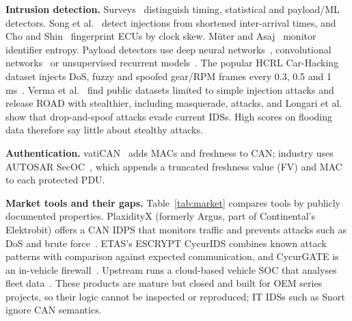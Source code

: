 \documentclass[runningheads]{llncs}
\begin{document}
\textbf{Intrusion detection.} Surveys~\cite{wu2020survey} distinguish timing, statistical and payload/ML detectors.
Song et al.~\cite{song2016} detect injections from shortened inter-arrival times, and Cho and Shin~\cite{cho2016cids}
fingerprint ECUs by clock skew. Müter and Asaj~\cite{muter2011} monitor identifier entropy. Payload detectors use deep neural networks~\cite{kang2016}, convolutional networks~\cite{song2020} or unsupervised
recurrent models~\cite{hanselmann2020}.
The popular HCRL Car-Hacking dataset injects DoS, fuzzy and spoofed gear/RPM frames every
0.3, 0.5 and 1\,ms~\cite{song2020}. Verma et al.~\cite{verma2024road} find public datasets limited to simple injection
attacks and release ROAD with stealthier, including masquerade, attacks, and Longari et al.~\cite{longari2025canter} show that drop-and-spoof
attacks evade current IDSs. High scores on flooding data therefore say little about stealthy attacks.

\textbf{Authentication.} vatiCAN~\cite{nurnberger2016} adds MACs and freshness to CAN; industry uses AUTOSAR
SecOC~\cite{autosar_secoc}, which appends a truncated freshness value (FV) and MAC to each protected PDU.

\textbf{Market tools and their gaps.} Table~\ref{tab:market} compares tools by publicly documented properties.
PlaxidityX (formerly Argus, part of Continental's Elektrobit) offers a CAN IDPS that monitors traffic and prevents
attacks such as DoS and brute force~\cite{plaxidityx}. ETAS's ESCRYPT CycurIDS combines known attack patterns with
comparison against expected communication, and CycurGATE is an in-vehicle firewall~\cite{etas}. Upstream runs a
cloud-based vehicle SOC that analyses fleet data~\cite{upstream2026}. These products are mature but closed and built
for OEM series projects, so their logic cannot be inspected or reproduced; IT IDSs such as Snort ignore CAN semantics.
\end{document}
